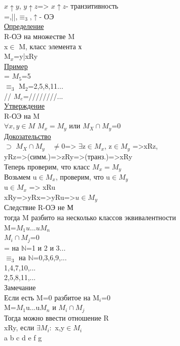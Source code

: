 \documentclass{article}
\begin{document}
$x\uparrow y$, $y\uparrow z$=> $x\uparrow z$- транзитивность\\
=,||,$\equiv_3$,$\uparrow$- ОЭ\\
\underline{Определение}\\
R-ОЭ на множестве M\\
x$\in$ M, класс элемента х\\
M$_x$={y|xRy}\\
\underline{Пример}\\
= $M_5$={5}\\
$\equiv_3$ M$_2$={2,5,8,11...}\\
// $M_e$={////////...}\\
\underline{Утверждение}\\
R-ОЭ на M\\
$\forall x,y\in M$ $M_x=M_y$ или $M_X \cap M_y$=0\\
\underline{Докозательство}\\
$\supset$ $M_X \cap M_y \quad \neq 0$=> $\exists$z$\in M_x$, z$\in M_y$ =>xRz,\\ yRz=>(симм.)=>zRy=>(транз.)=>xRy\\
Теперь проверим, что класс $M_x=M_y$\\
Возьмем u$\in M_x$, проверим, что u$\in M_y$\\
u$\in M_x$ => xRu\\
xRy=>yRx=>yRu=>$u\in M_y$\\
Следствие R-ОЭ не М\\
тогда M разбито на несколько классов эквивалентности\\
M=$M_1u...uM_n$\\
$M_i \cap M_j$=0\\
= на $\mathbb N$={1} и {2} и {3}...\\
$\equiv_3$ на $\mathbb N$={0,3,6,9,...}\\
{1,4,7,10,...}\\
{2,5,8,11,...}\\
Замечание\\
Если есть M=0 разбитое на M$_i$=0\\
M=$M_1$u...u$M_n$ и $M_i \cap M_j$\\
Тогда можно ввести отношение R\\
xRy, если $\exists M_i:$ x,y$\in M_i$\\
a b c d e f g\\
\\
\end{document}
